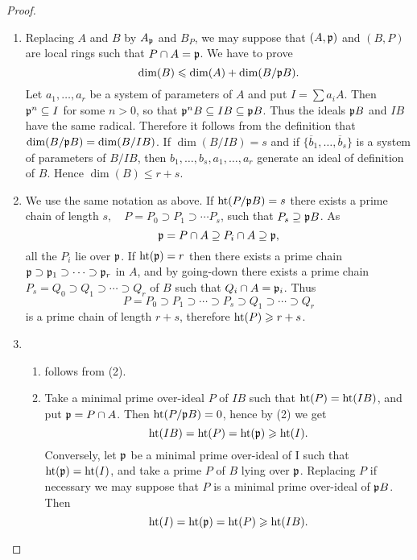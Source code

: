 \documentclass[../main]{subfiles}
\begin{document}
\begin{proof}
\begin{enumerate}[label=(\arabic*)]
    \item  Replacing $A$ and $B$ by $A_{\mathfrak{p}}$ and $B_P$, we may suppose that $(A, \mathfrak{p})$ and $(B, P)$ are local rings such that $P \cap A=\mathfrak{p}$. We have to prove \[\operatorname{dim}(B) \leqslant \operatorname{dim}(A)+\operatorname{dim}(B /\mathfrak{p}B).\] Let $a_1, \ldots, a_r$ be a system of parameters of $A$ and put $I=\sum a_i A$. Then $\mathfrak{p}^n \subseteq I$ for some $n>0$, so that $\mathfrak{p}^n B \subseteq I B \subseteq \mathfrak{p} B$. Thus the ideals $\mathfrak{p}B$ and $IB$ have the same radical. Therefore it follows from the definition that $\operatorname{dim}(B/\mathfrak{p}B)=\operatorname{dim}(B/IB)$. If $\dim(B/IB)=s$ and if $\{\overline{b}_1, \ldots, \overline{b}_s\}$ is a system of parameters of $B / I B$, then $b_1, \ldots, b_s, a_1, \ldots, a_r$ generate an ideal of definition of $B$. Hence $\dim(B) \leqslant r+s$.
    \item  We use the same notation as above. If $\operatorname{ht}(P /\mathfrak{p}B)=s$ there exists a prime chain of length $s,\quad P=P_0 \supset P_1 \supset \cdots P_s$, such that $P_s \supseteq\mathfrak{p}B$. As \[\mathfrak{p}=P \cap A \supseteq P_i \cap A \supseteq \mathfrak{p},\] all the $P_i$ lie over $\mathfrak{p}$. If $\operatorname{ht}(\mathfrak{p})=r$ then there exists a prime chain $\mathfrak{p} \supset\mathfrak{p}_1\supset\cdots\supset\mathfrak{p}_r$ in $A$, and by going-down there exists a prime chain $P_s=Q_0 \supset Q_1 \supset \cdots \supset Q_r$ of $B$ such that $Q_i \cap A=\mathfrak{p}_i$. Thus \[P=P_0 \supset P_1 \supset \cdots\supset P_s \supset Q_1 \supset \cdots\supset Q_r\] is a prime chain of length $r+s$, therefore $\operatorname{ht}(P) \geqslant r+s$.
    \item \begin{enumerate}[label = \roman*)]
        \item follows from (2). 
        \item Take a minimal prime over-ideal $P$ of $IB$ such that \newline $\operatorname{ht}(P)=\operatorname{ht}(I B)$, and put $\mathfrak{p}=P \cap A$. Then $\operatorname{ht}(P / \mathfrak{p}B)=0$, hence by (2) we get \[\operatorname{ht}(I B)=\operatorname{ht}(P)=\operatorname{ht}(\mathfrak{p})\geqslant \operatorname{ht}(I).\] Conversely, let $\mathfrak{p}$ be a minimal prime over-ideal of I such that $\operatorname{ht}(\mathfrak{p})=\operatorname{ht}(I)$, and take a prime $P$ of $B$ lying over $\mathfrak{p}$. Replacing $P$ if necessary we may suppose that $P$ is a minimal prime over-ideal of $\mathfrak{p}B$. Then \[\operatorname{ht}(I)=\operatorname{ht}(\mathfrak{p})=\operatorname{ht}(P)\geqslant \operatorname{ht}(I B).\]
    \end{enumerate}
\end{enumerate}

\end{proof}
\end{document}
